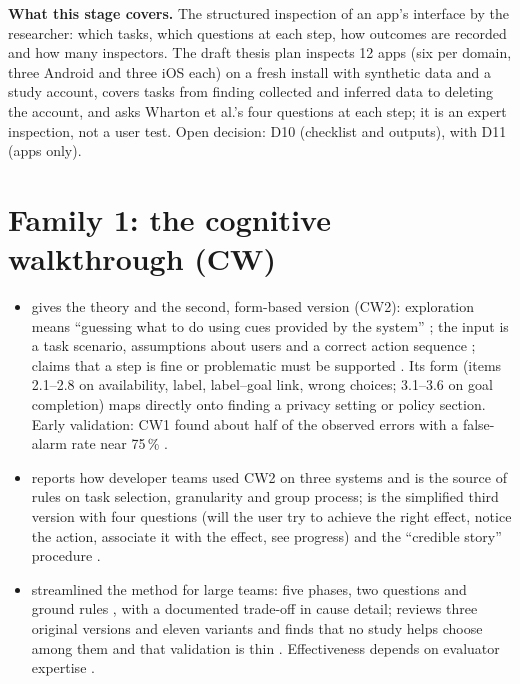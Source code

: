
\noindent\textbf{What this stage covers.} The structured inspection of an app's interface by the researcher: which tasks, which questions at each step, how outcomes are recorded and how many inspectors. The draft thesis plan inspects 12 apps (six per domain, three Android and three iOS each) on a fresh install with synthetic data and a study account, covers tasks from finding collected and inferred data to deleting the account, and asks Wharton et al.'s four questions at each step; it is an expert inspection, not a user test. Open decision: D10 (checklist and outputs), with D11 (apps only).

\section{Family 1: the cognitive walkthrough (CW)}
\begin{itemize}
\item {} gives the theory and the second, form-based version (CW2): exploration means ``guessing what to do using cues provided by the system'' ; the input is a task scenario, assumptions about users and a correct action sequence ; claims that a step is fine or problematic must be supported . Its form (items 2.1--2.8 on availability, label, label--goal link, wrong choices; 3.1--3.6 on goal completion) maps directly onto finding a privacy setting or policy section. Early validation: CW1 found about half of the observed errors with a false-alarm rate near 75\,\% .
\item {} reports how developer teams used CW2 on three systems and is the source of rules on task selection, granularity and group process;  is the simplified third version with four questions (will the user try to achieve the right effect, notice the action, associate it with the effect, see progress) and the ``credible story'' procedure .
\item {} streamlined the method for large teams: five phases, two questions and ground rules , with a documented trade-off in cause detail;  reviews three original versions and eleven variants and finds that no study helps choose among them and that validation is thin . Effectiveness depends on evaluator expertise .
\end{itemize}

